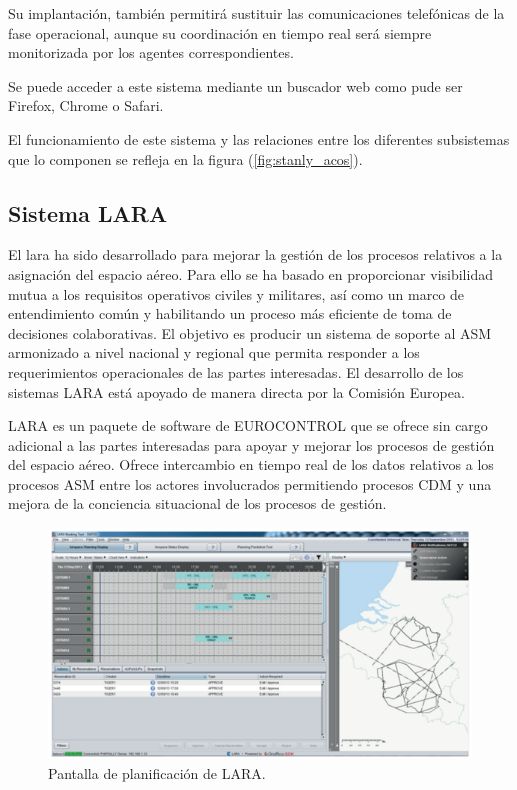 Su implantación, también permitirá sustituir las comunicaciones telefónicas de la fase operacional, aunque su coordinación en tiempo real será siempre monitorizada por los agentes correspondientes. 

Se puede acceder a este sistema mediante un buscador web como pude ser Firefox, Chrome o Safari. 

El funcionamiento de este sistema y las relaciones entre los diferentes subsistemas que lo componen se refleja en la figura (\ref{fig:stanly_acos}).

\subsection{Sistema LARA}

El \acrfull{lara} ha sido desarrollado para mejorar la gestión de los procesos relativos a la asignación del espacio aéreo. Para ello se ha basado en proporcionar visibilidad mutua a los requisitos operativos civiles y militares, así como un marco de entendimiento común y habilitando un proceso más eficiente de toma de decisiones colaborativas.
El objetivo es producir un sistema de soporte al ASM armonizado a nivel nacional y regional que permita responder a los requerimientos operacionales de las partes interesadas. El desarrollo de los sistemas LARA está apoyado de manera directa por la Comisión Europea.

LARA es un paquete de software de EUROCONTROL que se ofrece sin cargo adicional a las partes interesadas para apoyar y mejorar los procesos de gestión del espacio aéreo. Ofrece intercambio en tiempo real de los datos relativos a los procesos ASM entre los actores involucrados permitiendo procesos CDM y una mejora de la conciencia situacional de los procesos de gestión.

\begin{figure}[H]
    \centering
    \includegraphics[width=0.8\linewidth]{figuras/lara.png}
    \caption{Pantalla de planificación de LARA.}
    \label{fig:lara}
\end{figure}

